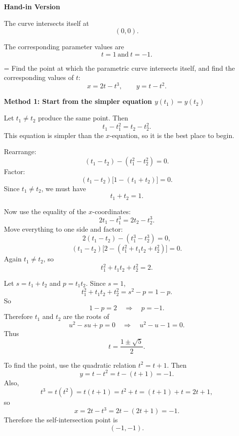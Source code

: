 \documentclass[a4paper,12pt,twocolumn]{article}
\newlength{\problemnumberwidth}
\newlength{\subproblemnumberwidth}
\newenvironment{solutionbox}{\begin{framed}}{\end{framed}}
\newcommand{\subproblem}[3]{%
  \Needspace{10\baselineskip}%
  \phantomsection\label{#1}%
  \par\vspace{0.8em}%
  \noindent
  \hangindent=\subproblemnumberwidth
  \hangafter=1
  \makebox[\subproblemnumberwidth][l]{\textbf{#2.}}#3\par
}
\begin{document}
\begin{solutionbox}
\textbf{Hand-in Version}

The curve intersects itself at
\[
\boxed{(0,0)}.
\]

The corresponding parameter values are
\[
\boxed{t=1\ \text{and}\ t=-1.}
\]
\end{solutionbox}

\subproblem{prob:10-1-57b}{57(b)}{Find the point at which the parametric curve intersects itself, and find the corresponding values of \(t\):
\[
x=2t-t^3,\qquad y=t-t^2.
\]}

\begin{solutionbox}
\textbf{Method 1: Start from the simpler equation \(y(t_1)=y(t_2)\)}

\begin{steps}
\item Let \(t_1\neq t_2\) produce the same point. Then
\[
t_1-t_1^2=t_2-t_2^2.
\]
This equation is simpler than the \(x\)-equation, so it is the best place to begin.

\item Rearrange:
\[
(t_1-t_2)-(t_1^2-t_2^2)=0.
\]
Factor:
\[
(t_1-t_2)\bigl[1-(t_1+t_2)\bigr]=0.
\]
Since \(t_1\neq t_2\), we must have
\[
t_1+t_2=1.
\]

\item Now use the equality of the \(x\)-coordinates:
\[
2t_1-t_1^3=2t_2-t_2^3.
\]
Move everything to one side and factor:
\[
2(t_1-t_2)-(t_1^3-t_2^3)=0,
\]
\[
(t_1-t_2)\bigl[2-(t_1^2+t_1t_2+t_2^2)\bigr]=0.
\]
Again \(t_1\neq t_2\), so
\[
t_1^2+t_1t_2+t_2^2=2.
\]

\item Let \(s=t_1+t_2\) and \(p=t_1t_2\). Since \(s=1\),
\[
t_1^2+t_1t_2+t_2^2=s^2-p=1-p.
\]
So
\[
1-p=2
\quad\Longrightarrow\quad
p=-1.
\]
Therefore \(t_1\) and \(t_2\) are the roots of
\[
u^2-su+p=0
\quad\Longrightarrow\quad
u^2-u-1=0.
\]
Thus
\[
t=\frac{1\pm\sqrt5}{2}.
\]

\item To find the point, use the quadratic relation \(t^2=t+1\). Then
\[
y=t-t^2=t-(t+1)=-1.
\]
Also,
\[
t^3=t(t^2)=t(t+1)=t^2+t=(t+1)+t=2t+1,
\]
so
\[
x=2t-t^3=2t-(2t+1)=-1.
\]
Therefore the self-intersection point is
\[
(-1,-1).
\]
\end{steps}
\end{solutionbox}
\end{document}
